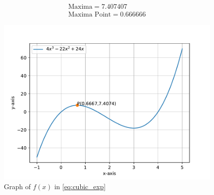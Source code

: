 \documentclass[journal,10pt,twocolumn]{article}
\begin{document}
    \begin{align}
        \boxed{\text{Maxima} = 7.407407}\\
        \boxed{\text{Maxima Point} = 0.666666}
    \end{align}

\begin{figure}[t]
	\centering
	\includegraphics[width=1\columnwidth]{figs/fig1.pdf}
	\caption{Graph of $f(x)$ in \eqref{eq:cubic_exp}}
	\label{fig:graph_fx}
\end{figure}
\end{document}
